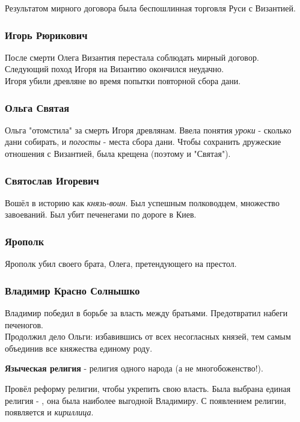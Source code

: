 Результатом мирного договора была беспошлинная торговля Руси с Византией.

\subsubsection*{Игорь Рюрикович}

После смерти Олега Византия перестала соблюдать мирный договор. \\
Следующий поход Игоря на Византию окончился неудачно. \\
Игоря убили древляне во время попытки повторной сбора дани.

\subsubsection*{Ольга Святая}

Ольга "отомстила" за смерть Игоря древлянам.
Ввела понятия \textit{уроки} - сколько дани собирать, и \textit{погосты} - места сбора дани. 
Чтобы сохранить дружеские отношения с Византией, была крещена (поэтому и "Святая").

\subsubsection*{Святослав Игоревич}

Вошёл в историю как \textit{князь-воин}. Был успешным полководцем, множество завоеваний. Был убит печенегами по дороге в Киев.

\subsubsection*{Ярополк}

Ярополк убил своего брата, Олега, претендующего на престол.

\subsubsection*{Владимир Красно Солнышко}

Владимир победил в борьбе за власть между братьями. Предотвратил набеги печеногов. \\
Продолжил дело Ольги: избавившись от всех несогласных князей, тем самым объединив все княжества единому роду. 

\textbf{Языческая религия} - религия одного народа (а не многобоженство!).

Провёл реформу религии, чтобы укрепить свою власть. Была выбрана единая религия - , она была наиболее выгодной Владимиру.
С появлением религии, появляется и \textit{кириллица}. 

